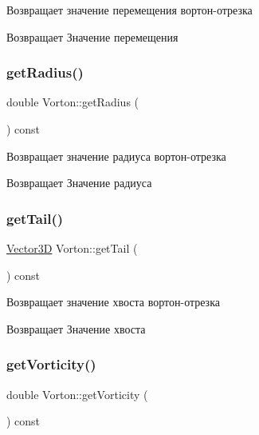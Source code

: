 Возвращает значение перемещения вортон-\/отрезка \begin{DoxyReturn}{Возвращает}
Значение перемещения 
\end{DoxyReturn}
\mbox{\label{class_vorton_a623eaa7a5716b9499f0872960fdb0052}} 
\subsubsection{\texorpdfstring{get\+Radius()}{getRadius()}}
{\footnotesize\ttfamily double Vorton\+::get\+Radius (\begin{DoxyParamCaption}{ }\end{DoxyParamCaption}) const}

Возвращает значение радиуса вортон-\/отрезка \begin{DoxyReturn}{Возвращает}
Значение радиуса 
\end{DoxyReturn}
\mbox{\label{class_vorton_a3f0a542df7fcc9436e62b0062a70df10}} 
\subsubsection{\texorpdfstring{get\+Tail()}{getTail()}}
{\footnotesize\ttfamily \mbox{\hyperlink{class_vector3_d}{Vector3D}} Vorton\+::get\+Tail (\begin{DoxyParamCaption}{ }\end{DoxyParamCaption}) const}

Возвращает значение хвоста вортон-\/отрезка \begin{DoxyReturn}{Возвращает}
Значение хвоста 
\end{DoxyReturn}
\mbox{\label{class_vorton_a2e71d444521b5d0639d145a497ce52a2}} 
\subsubsection{\texorpdfstring{get\+Vorticity()}{getVorticity()}}
{\footnotesize\ttfamily double Vorton\+::get\+Vorticity (\begin{DoxyParamCaption}{ }\end{DoxyParamCaption}) const}

